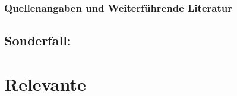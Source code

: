 \subsubsection{{\protect\dsliterary} Quellenangaben und
Weiterführende Literatur}
\cite{GabkaInjektionstechnik,InjektionenLeichtGemacht4,LippertAnatomie7}


\subsection{Sonderfall: 
}


\section{Relevante }


\subsection{}

\subsubsection{}

